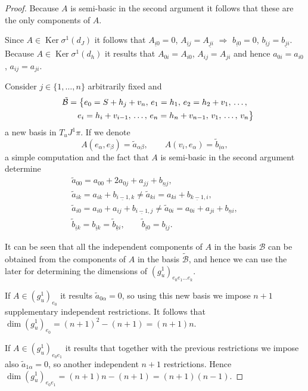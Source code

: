 \documentclass[pdftex]{sigma}
\begin{document}
\begin{proof}
Because $A$ is semi-basic in the second argument it follows that
these are the only components of $A$.

Since $A\in\operatorname{Ker}\sigma^{1}(d_{J})$ it follows that $A_{\underline{i}0}=0$, $A_{\underline{i}j}=A_{\underline{j}i}$ $\Rightarrow$ $b_{\underline{i}0}=0$, $b_{\underline{i}j}=b_{\underline{j}i}$.
Because $A\in\operatorname{Ker}\sigma^{1}(d_{h})$ it results that
$A_{0i}=A_{i0}$, $A_{ij}=A_{ji}$ and hence $a_{0i}=a_{i0}$, $a_{ij}=a_{ji}$.

Consider $j\in \{1,\dots, n\} $ arbitrarily f\/ixed and
\begin{gather*}
\mathcal{\tilde{B}}=\big\{ e_{0}=S+h_{j}+v_{n},\, e_{1}=h_{1},\, e_{2}=h_{2}+v_{1}, \, \dots,\\
 \hphantom{\mathcal{\tilde{B}}=\big\{}{} e_{i}=h_{i}+v_{i-1},\, \dots,\, e_{n}=h_{n}+v_{n-1},\, v_{1},\, \dots,\, v_{n}\big\}
\end{gather*}
 a new basis in $T_{u}J^{1}\pi$. If we denote \[
A(e_{\alpha},e_{\beta})=\tilde{a}_{\alpha\beta},\qquad A(v_{i},e_{\alpha})=\tilde{b}_{\underline{i}\alpha},\]
 a simple computation and the fact that $A$ is semi-basic in the
second argument determine \begin{gather*}
\tilde{a}_{00}   =   a_{00}+2a_{0j}+a_{jj}+b_{\underline{n}j},\\
\tilde{a}_{ik}   =   a_{ik}+b_{\underline{i-1},k}\neq\tilde{a}_{ki}=a_{ki}+b_{\underline{k-1},i},\\
\tilde{a}_{i0}   =   a_{i0}+a_{ij}+b_{\underline{i-1},j}\neq\tilde{a}_{0i}=a_{0i}+a_{ji}+b_{\underline{n}i},\\
\tilde{b}_{\underline{i}k}   =b_{\underline{i}k}   =\tilde{b}_{\underline{k}i},\qquad
\tilde{b}_{\underline{i}0}   =   b_{\underline{i}j}.
\end{gather*}


It can be seen that all the independent components of $A$ in the
basis $\mathcal{B}$ can be obtained from the components of $A$ in
the basis $\mathcal{\tilde{B}}$, and hence we can use the later for
determining the dimensions of $(g_{u}^{1})_{e_{0} e_{1}\dots e_{k}}$.

If $A\in(g_{u}^{1})_{e_{0}}$ it results $\tilde{a}_{0\alpha}=0$,
so using this new basis we impose $n+1$ supplementary independent
restrictions. It follows that $\dim(g_{u}^{1})_{e_{0}}=(n+1)^{2}-(n+1)=(n+1)n$.

If $A\in(g_{u}^{1})_{e_{0} e_{1}}$ it results that together with
the previous restrictions we impose also $\tilde{a}_{1\alpha}=0$,
so another independent $n+1$ restrictions. Hence $\dim (g_{u}^{1})_{e_{0} e_{1}}=(n+1)n-(n+1)=(n+1)(n-1)$.


\end{proof}
\end{document}
